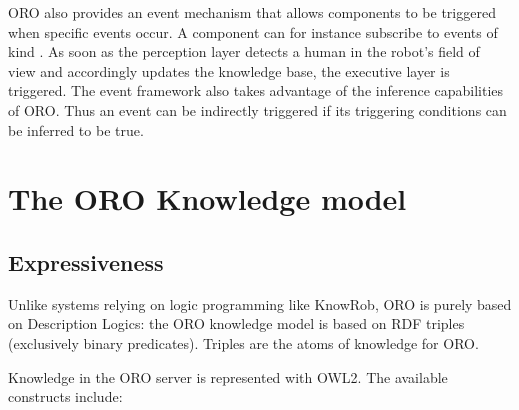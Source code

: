 ORO also provides an event mechanism that allows components to be triggered
when specific events occur. A component can for instance subscribe to events
of kind . As soon as the
perception layer detects a human in the robot's field of view and accordingly
updates the knowledge base, the executive layer is triggered. The event
framework also takes advantage of the inference capabilities of ORO. Thus an
event can be indirectly triggered if its triggering conditions can be
inferred to be true.




\section{The ORO Knowledge model}
\label{sect|knowledge-model}

\subsection{Expressiveness}
\label{sect|oro-expressiveness}

Unlike systems relying on logic programming like {\sc KnowRob}, ORO is purely
based on Description Logics: the ORO knowledge model is based on RDF triples
(\ie exclusively binary predicates). Triples 
are the atoms of knowledge for ORO.

Knowledge in the ORO server is represented with OWL2. The available constructs
include:

